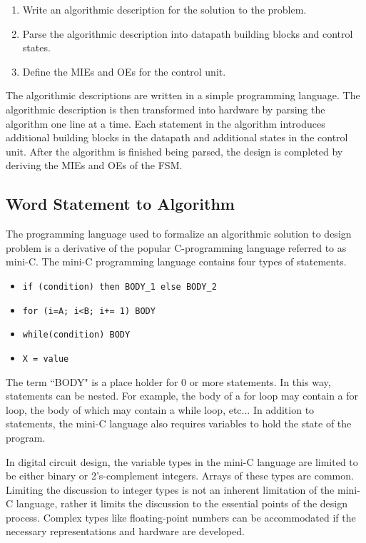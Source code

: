 \begin{enumerate}
    \item Write an algorithmic description for the solution to the problem.
    \item Parse the algorithmic description into datapath building blocks and control states.
    \item Define the MIEs and OEs for the control unit.
\end{enumerate}

The algorithmic descriptions are written in a simple programming language.
The algorithmic description is then transformed into hardware by
parsing the algorithm one line at a time.  Each statement in the
algorithm introduces additional building blocks in the datapath and
additional states in the control unit.  After the algorithm is finished
being parsed, the design is completed by deriving the MIEs and OEs of the
FSM.

\subsection{Word Statement to Algorithm}
The programming language used to formalize an algorithmic
solution to design problem is a derivative of the popular C-programming
language referred to as mini-C.  The mini-C programming language contains
four types of statements.

\begin{itemize}
    \item \verb^if (condition) then BODY_1 else BODY_2^
    \item \verb^for (i=A; i<B; i+= 1) BODY^
    \item \verb^while(condition) BODY^
    \item \verb^X = value^
\end{itemize}

The term ``BODY" is a place holder for 0 or more statements.  In this way,
statements can be nested.  For example, the body of a for loop may contain
a for loop, the body of which may contain a while loop, etc...  In addition
to statements, the mini-C language also requires variables to hold the state
of the program.

In digital circuit design, the variable types in the mini-C language
are limited to be either binary or 2's-complement integers.  Arrays
of these types are common.  Limiting the discussion to integer types
is not an inherent limitation of the mini-C language, rather it limits
the discussion to the essential points of the design process.  Complex
types like floating-point numbers can be accommodated if the necessary
representations and hardware are developed.

